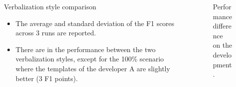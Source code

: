\documentclass[
    11pt,
    notheorems,
    xcolor={dvipsnames},
    hyperref={
        pdfstartview=FitH, 
        pdftitle={Ikasketa-adibide urriko Informazio-Erauzketa}, 
        pdfauthor={Oscar Sainz Jimenez}, 
        citecolor=secondary, 
    }
]{beamer}
\begin{document}
\begin{frame}
    \begin{columns}
        \begin{column}{0.4\textwidth}
            \begin{block}{Verbalization style comparison}

                \begin{itemize}
                    \item The average and standard deviation of the F1 scores across 3 runs are reported.
                    \item There are  in the performance between the two verbalization styles, except for the 100\% scenario where the templates of the developer A are slightly better (3 F1 points).
                \end{itemize}
            \end{block}
        \end{column}

        \begin{column}{0.46\textwidth}
            \begin{figure}
                \centering
                \resizebox{\textwidth}{!}{
                    
                }
                \caption{Performance difference on the development.}
            \end{figure}
        \end{column}
    \end{columns}

\end{frame}

\end{document}
